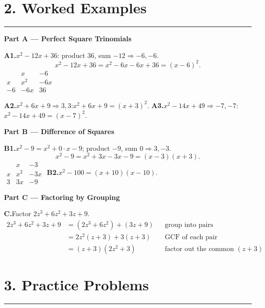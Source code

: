 \documentclass[11pt]{article}
\newcommand{\sectionrule}{\vspace{2pt}\hrule\vspace{8pt}}
\begin{document}
\section*{\textcolor{brandpurple}{2. Worked Examples}}
\sectionrule

\noindent\textbf{\textcolor{brandpurple}{Part A --- Perfect Square Trinomials}}

\medskip
\textbf{A1.}\quad $x^2 - 12x + 36$: \; product $36$, sum $-12 \Rightarrow -6,-6$.
\[ x^2 - 12x + 36 = x^2 - 6x - 6x + 36 = (x-6)^2 . \]
$\begin{array}{c|c|c}
   & x & -6 \\ \hline
 x & x^2 & -6x \\ \hline
 -6 & -6x & 36
\end{array}$

\medskip
\textbf{A2.}\quad $x^2 + 6x + 9 \Rightarrow 3,3$:\quad $x^2+6x+9=(x+3)^2$.
\qquad
\textbf{A3.}\quad $x^2 - 14x + 49 \Rightarrow -7,-7$:\quad $x^2-14x+49=(x-7)^2$.

\bigskip
\noindent\textbf{\textcolor{brandteal}{Part B --- Difference of Squares}}

\medskip
\textbf{B1.}\quad $x^2 - 9 = x^2 + 0\cdot x - 9$; \; product $-9$, sum $0 \Rightarrow 3,-3$.
\[ x^2 - 9 = x^2 + 3x - 3x - 9 = (x-3)(x+3) . \]
$\begin{array}{c|c|c}
   & x & -3 \\ \hline
 x & x^2 & -3x \\ \hline
 3 & 3x & -9
\end{array}$
\qquad
\textbf{B2.}\quad $x^2 - 100 = (x+10)(x-10)$.

\bigskip
\noindent\textbf{\textcolor{brandblue}{Part C --- Factoring by Grouping}}

\medskip
\textbf{C.}\quad Factor $2z^3 + 6z^2 + 3z + 9$.
\begin{align*}
2z^3 + 6z^2 + 3z + 9 &= (2z^3 + 6z^2) + (3z + 9) &&\text{group into pairs}\\
 &= 2z^2(z+3) + 3(z+3) &&\text{GCF of each pair}\\
 &= (z+3)(2z^2 + 3) &&\text{factor out the common } (z+3)
\end{align*}

\newpage
\section*{\textcolor{brandpurple}{3. Practice Problems}}
\sectionrule
\end{document}
